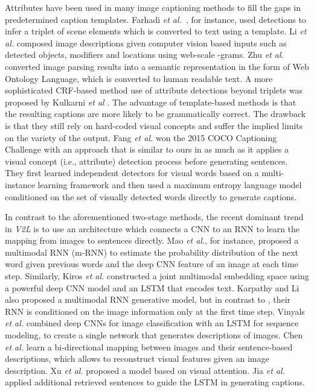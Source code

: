 \documentclass[10pt,journal,compsoc]{IEEEtran}
\newcommand{\etal}{\emph{et al.}}
\def\V2L{\textit{V2L}}
\begin{document}
Attributes have been used in many image captioning methods to fill the gaps in predetermined caption templates. Farhadi \etal~\cite{farhadi2010every}, for instance, used detections to infer a triplet of scene elements which is converted to text using a template. Li \etal \cite{li2011composing} composed image descriptions given computer vision based inputs such as detected objects, modifiers and locations using web-scale -grams. Zhu \etal \cite{yao2010i2t} converted image parsing results into a semantic representation in the form of Web Ontology Language, which is converted to human readable text. A more sophisticated CRF-based method use of attribute detections beyond triplets was proposed by Kulkarni \textit{et al} \cite{kulkarni2013babytalk}. The advantage of template-based methods is that the resulting captions are more likely to be grammatically correct. The drawback is that they still rely on hard-coded visual concepts and suffer the implied limits on the variety of the output. Fang \etal \cite{fang2014captions} won the 2015 COCO Captioning Challenge with an approach that is similar to ours in as much as it applies a visual concept (i.e., attribute) detection process before generating sentences. They first learned  independent detectors for visual words based on a multi-instance learning framework and then used a maximum entropy language model conditioned on the set of visually detected words directly to generate captions. 


In contrast to the aforementioned two-stage methods, the recent dominant trend in \V2L is to use an architecture which connects a CNN to an RNN to learn the mapping from images to sentences directly. Mao \etal \cite{mao2014deep}, for instance, proposed a multimodal RNN (m-RNN) to estimate the probability distribution of the next word given previous words and the deep CNN feature of an image at each time step. Similarly, Kiros \etal \cite{kiros2014unifying} constructed a joint multimodal embedding space using a powerful deep CNN model and an LSTM that encodes text. Karpathy and Li \cite{Karpathy2014deepvs} also proposed a multimodal RNN generative model, but in contrast to \cite{mao2014deep}, their RNN is conditioned on the image information only at the first time step. Vinyals \etal \cite{vinyals2014show} combined deep CNNs for image classification with an LSTM for sequence modeling, to create a single network that generates descriptions of images. Chen \etal \cite{Chen2015CVPRMind} learn a bi-directional mapping between images and their sentence-based descriptions, which allows to reconstruct visual features given an image description. Xu \etal \cite{xu2015show} proposed a model based on visual attention. Jia \etal \cite{jia2015guilding} applied additional retrieved sentences to guide the LSTM in generating captions.
\end{document}
